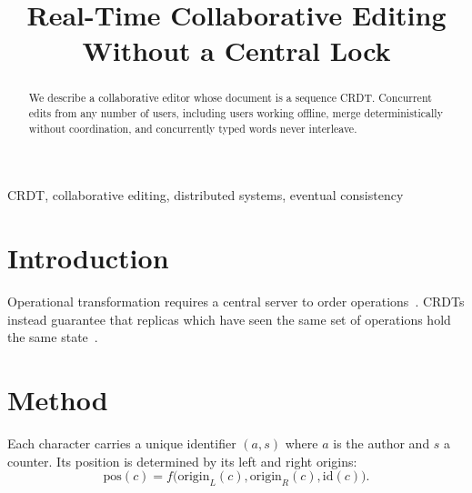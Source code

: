 \documentclass[conference]{IEEEtran}
\begin{document}
\title{Real-Time Collaborative Editing Without a Central Lock}

\author{
\and
{}
}

\maketitle

\begin{abstract}
We describe a collaborative editor whose document is a sequence CRDT. Concurrent edits from
any number of users, including users working offline, merge deterministically without
coordination, and concurrently typed words never interleave.
\end{abstract}

\begin{IEEEkeywords}
CRDT, collaborative editing, distributed systems, eventual consistency
\end{IEEEkeywords}

\section{Introduction}
Operational transformation requires a central server to order operations~\cite{ellis1989}.
CRDTs instead guarantee that replicas which have seen the same set of operations hold the same
state~\cite{shapiro2011}.

\section{Method}
Each character carries a unique identifier $(a, s)$ where $a$ is the author and $s$ a counter.
Its position is determined by its left and right origins:
\begin{equation}
  \mathrm{pos}(c) = f\bigl(\mathrm{origin}_L(c), \mathrm{origin}_R(c), \mathrm{id}(c)\bigr).
\end{equation}
\end{document}
